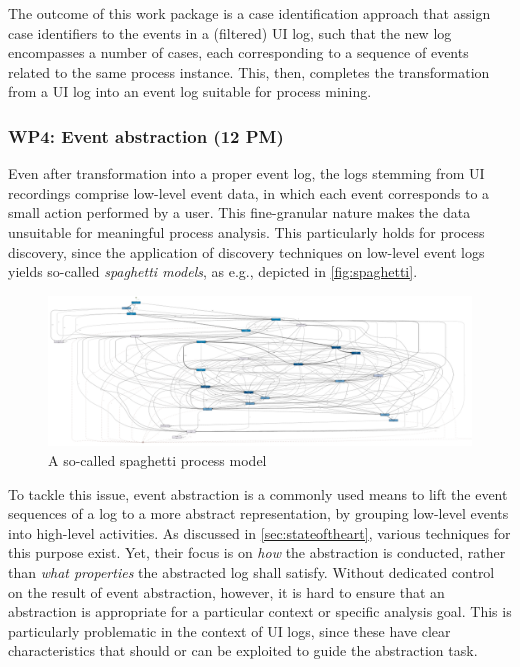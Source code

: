 The outcome of this work package is a case identification approach that assign case identifiers to the events in a (filtered) UI log, such that the new log encompasses a number of cases, each corresponding to a sequence of events related to the same process instance. This, then, completes the transformation from a UI log into an event log suitable for process mining.


\subsubsection{WP4: Event abstraction (12 PM)}
\label{sec:wp4}

Even after transformation into a proper event log, the logs stemming from UI recordings comprise low-level event data, in which each event corresponds to a small action performed by a user. This fine-granular nature makes the data unsuitable for meaningful process analysis. This particularly holds for process discovery, since the application of discovery techniques on low-level event logs yields so-called \emph{spaghetti models}, as e.g., depicted in \autoref{fig:spaghetti}.

\begin{figure} 
	\vspace{-15pt}
	\begin{center}
		\includegraphics[width=\linewidth]{figures/spaghettiprocess.png}
		\caption{A so-called spaghetti process model}
		\label{fig:spaghetti}
	\end{center}
	\vspace{-15pt}
	\vspace{1pt}
\end{figure} 

To tackle this issue, event abstraction is a commonly used means to lift the event sequences of a log to a more abstract representation, by grouping low-level events into high-level activities. 
As discussed in \autoref{sec:stateoftheart}, various techniques for this purpose exist. Yet, their focus is on \emph{how} the abstraction is conducted, rather than \emph{what properties} the abstracted log shall satisfy. Without dedicated control on the result of event abstraction, however, it is hard to ensure that an abstraction is appropriate for a particular context or specific analysis goal.
This is particularly problematic in the context of UI logs, since these have clear characteristics that should or can be exploited to guide the abstraction task.

